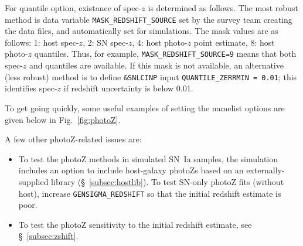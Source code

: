 \documentclass[12pt]{article}
\begin{document}
For quantile option, existance of spec-$z$ is determined as follows.
The most robust method is data variable {\tt MASK\_REDSHIFT\_SOURCE}
set by the survey team creating the data files, and automatically
set for simulations. The mask values are as follows:
1: host spec-$z$, 2: SN spec-$z$, 4: host photo-$z$ point estimate, 
8: host photo-$z$ quantiles.
Thus, for example, {\tt MASK\_REDSHIFT\_SOURCE=9} means that
both spec-$z$ and quantiles are available.
If this mask is not available, an alternative (less robust) method
is to define {\tt \&SNLCINP} input {\tt QUANTILE\_ZERRMIN = 0.01};
this identifies spec-$z$ if redshift uncertainty is below 0.01.



To get going quickly, some useful examples of setting
the namelist options are given below in Fig.~\ref{fig:photoZ}.

\bigskip
A few other photoZ-related issues are:
\begin{itemize}
  \item	To test the photoZ methods in simulated SN~Ia samples,
	the simulation includes an option to include host-galaxy 
	photoZs based on an externally-supplied library 
	(\S~\ref{subsec:hostlib}). To test SN-only photoZ
	fits (without host), increase {\tt GENSIGMA\_REDSHIFT}
	so that the initial redshift estimate is poor.
%
\item	To test the photoZ sensitivity to the initial redshift estimate,
        see \S~\ref{subsec:zshift}.
\end{itemize}
\end{document}
